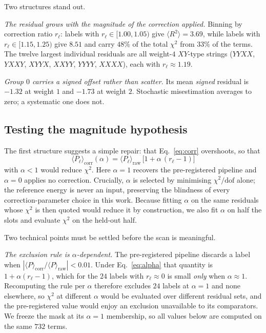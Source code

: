 \documentclass[aps,prx,twocolumn,superscriptaddress,nofootinbib,floatfix]{revtex4-2}
\begin{document}
Two structures stand out.

\emph{The residual grows with the magnitude of the correction applied.}
Binning by correction ratio $r_\ell$: labels with
$r_\ell\in[1.00,1.05)$ give $\langle R^2\rangle = 3.69$, while labels with
$r_\ell\in[1.15,1.25)$ give $8.51$ and carry $48\%$ of the total $\chi^2$
from $33\%$ of the terms. The twelve largest individual residuals are all
weight-$4$ $XY$-type strings ($YYXX$, $YXXY$, $XYYX$, $XXYY$, $YYYY$,
$XXXX$), each with $r_\ell\approx1.19$.

\emph{Group $0$ carries a signed offset rather than scatter.} Its mean
\emph{signed} residual is $-1.32$ at weight $1$ and $-1.73$ at weight $2$.
Stochastic misestimation averages to zero; a systematic one does not.

\subsection{Testing the magnitude hypothesis}

The first structure suggests a simple repair: that
Eq.~\eqref{eq:corr} overshoots, so that
\begin{equation}
\langle P_\ell\rangle_{\mathrm{corr}}(\alpha)
= \langle P_\ell\rangle_{\mathrm{raw}}\,\bigl[1 + \alpha\,(r_\ell-1)\bigr]
\label{eq:alpha}
\end{equation}
with $\alpha<1$ would reduce $\chi^2$. Here $\alpha=1$ recovers the
pre-registered pipeline and $\alpha=0$ applies no correction. Crucially,
$\alpha$ is selected by minimising $\chi^2/\mathrm{dof}$ alone; the
reference energy is never an input, preserving the blindness of every
correction-parameter choice in this work. Because fitting $\alpha$ on the
same residuals whose $\chi^2$ is then quoted would reduce it by
construction, we also fit $\alpha$ on half the slots and evaluate
$\chi^2$ on the held-out half.

Two technical points must be settled before the scan is meaningful.

\emph{The exclusion rule is $\alpha$-dependent.} The pre-registered
pipeline discards a label when $|\langle P\rangle_{\mathrm{corr}} /
\langle P\rangle_{\mathrm{raw}}| < 0.01$. Under Eq.~\eqref{eq:alpha} that
quantity is $1+\alpha(r_\ell-1)$, which for the $24$ labels with
$r_\ell\approx0$ is small \emph{only} when $\alpha\approx1$. Recomputing
the rule per $\alpha$ therefore excludes $24$ labels at $\alpha=1$ and
none elsewhere, so $\chi^2$ at different $\alpha$ would be evaluated over
different residual sets, and the pre-registered value would enjoy an
exclusion unavailable to its comparators. We freeze the mask at its
$\alpha=1$ membership, so all values below are computed on the same $732$
terms.
\end{document}
